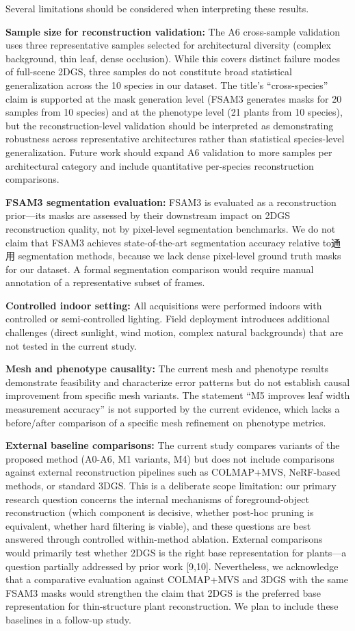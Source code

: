 \documentclass[11pt,a4paper]{article}
\begin{document}
Several limitations should be considered when interpreting these
results.

\textbf{Sample size for reconstruction validation:} The A6 cross-sample
validation uses three representative samples selected for architectural
diversity (complex background, thin leaf, dense occlusion). While this
covers distinct failure modes of full-scene 2DGS, three samples do not
constitute broad statistical generalization across the 10 species in our
dataset. The title's ``cross-species'' claim is supported at the mask
generation level (FSAM3 generates masks for 20 samples from 10 species)
and at the phenotype level (21 plants from 10 species), but the
reconstruction-level validation should be interpreted as demonstrating
robustness across representative architectures rather than statistical
species-level generalization. Future work should expand A6 validation to
more samples per architectural category and include quantitative
per-species reconstruction comparisons.

\textbf{FSAM3 segmentation evaluation:} FSAM3 is evaluated as a
reconstruction prior---its masks are assessed by their downstream impact
on 2DGS reconstruction quality, not by pixel-level segmentation
benchmarks. We do not claim that FSAM3 achieves state-of-the-art
segmentation accuracy relative to通用 segmentation methods, because we
lack dense pixel-level ground truth masks for our dataset. A formal
segmentation comparison would require manual annotation of a
representative subset of frames.

\textbf{Controlled indoor setting:} All acquisitions were performed
indoors with controlled or semi-controlled lighting. Field deployment
introduces additional challenges (direct sunlight, wind motion, complex
natural backgrounds) that are not tested in the current study.

\textbf{Mesh and phenotype causality:} The current mesh and phenotype
results demonstrate feasibility and characterize error patterns but do
not establish causal improvement from specific mesh variants. The
statement ``M5 improves leaf width measurement accuracy'' is not
supported by the current evidence, which lacks a before/after comparison
of a specific mesh refinement on phenotype metrics.

\textbf{External baseline comparisons:} The current study compares
variants of the proposed method (A0-A6, M1 variants, M4) but does not
include comparisons against external reconstruction pipelines such as
COLMAP+MVS, NeRF-based methods, or standard 3DGS. This is a deliberate
scope limitation: our primary research question concerns the internal
mechanisms of foreground-object reconstruction (which component is
decisive, whether post-hoc pruning is equivalent, whether hard filtering
is viable), and these questions are best answered through controlled
within-method ablation. External comparisons would primarily test
whether 2DGS is the right base representation for plants---a question
partially addressed by prior work {[}9,10{]}. Nevertheless, we
acknowledge that a comparative evaluation against COLMAP+MVS and 3DGS
with the same FSAM3 masks would strengthen the claim that 2DGS is the
preferred base representation for thin-structure plant reconstruction.
We plan to include these baselines in a follow-up study.
\end{document}
